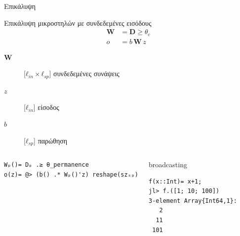\documentclass[10pt,lualatex]{beamer}
\begin{document}
\begin{frame}[fragile]{Επικάλυψη}
\begin{block}{Επικάλυψη μικροστηλών με συνδεδεμένες εισόδους}
  \begin{align*}
    \mathbf{W} &= \mathbf{D} \ge θ_c\\
    o &= b\,\mathbf{W}\,z
  \end{align*}
  \vspace{-2.2\topsep}
  \begin{description}
  \item[$\mathbf{W}$] [$ℓ_{in} × ℓ_{sp}$] συνδεδεμένες συνάψεις
  \item[$z$] [$ℓ_{in}$] είσοδος
  \item[$b$] [$ℓ_{sp}$] παρώθηση
  \end{description}
\end{block}
\pause
\begin{columns}[T]
\begin{verbatim}
Wₚ()= Dₚ .≥ θ_permanence
o(z)= @> (b() .* Wₚ()'z) reshape(szₛₚ)
\end{verbatim}
\pause
{}
\begin{block}{broadcasting}
\begin{verbatim}
f(x::Int)= x+1;
jl> f.([1; 10; 100])
3-element Array{Int64,1}:
   2
  11
 101
\end{verbatim}
\end{block}
\end{columns}
\end{frame}
\end{document}
